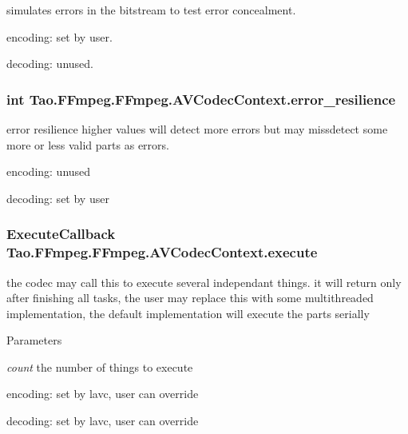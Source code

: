 \label{struct_tao_1_1_f_fmpeg_1_1_f_fmpeg_1_1_a_v_codec_context_a08aec2b15e9572f2fa0b3694540272e8}
simulates errors in the bitstream to test error concealment.
\begin{DoxyItemize}
\item encoding: set by user.
\item decoding: unused. 
\end{DoxyItemize}\hypertarget{struct_tao_1_1_f_fmpeg_1_1_f_fmpeg_1_1_a_v_codec_context_a30533ba356fcacc60d1b9e223c848254}{
\subsubsection[{error\_\-resilience}]{\setlength{\rightskip}{0pt plus 5cm}int {\bf Tao.FFmpeg.FFmpeg.AVCodecContext.error\_\-resilience}}}
\label{struct_tao_1_1_f_fmpeg_1_1_f_fmpeg_1_1_a_v_codec_context_a30533ba356fcacc60d1b9e223c848254}
error resilience higher values will detect more errors but may missdetect some more or less valid parts as errors.
\begin{DoxyItemize}
\item encoding: unused
\item decoding: set by user 
\end{DoxyItemize}\hypertarget{struct_tao_1_1_f_fmpeg_1_1_f_fmpeg_1_1_a_v_codec_context_a715241b68abafe3d68f967b13e514bec}{
\subsubsection[{execute}]{\setlength{\rightskip}{0pt plus 5cm}ExecuteCallback {\bf Tao.FFmpeg.FFmpeg.AVCodecContext.execute}}}
\label{struct_tao_1_1_f_fmpeg_1_1_f_fmpeg_1_1_a_v_codec_context_a715241b68abafe3d68f967b13e514bec}
the codec may call this to execute several independant things. it will return only after finishing all tasks, the user may replace this with some multithreaded implementation, the default implementation will execute the parts serially 
\begin{DoxyParams}{Parameters}
\item[{\em count}]the number of things to execute
\begin{DoxyItemize}
\item encoding: set by lavc, user can override
\item decoding: set by lavc, user can override 
\end{DoxyItemize}\end{DoxyParams}
